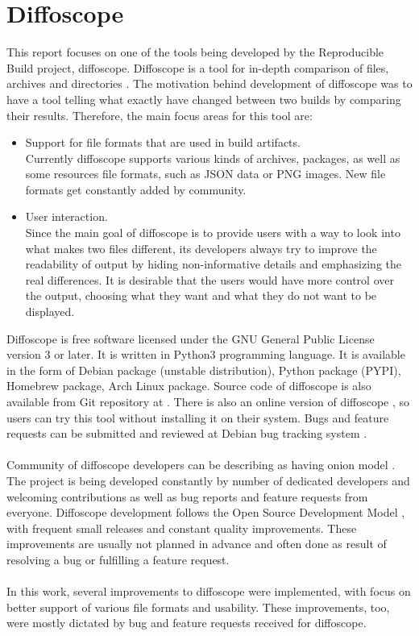 \section{Diffoscope}

This report focuses on one of the tools being developed by the
Reproducible Build project, diffoscope.
Diffoscope is a tool for in-depth comparison of files, archives and
directories \autocite{dfs}.
The motivation behind development of diffoscope was to have a tool
telling what exactly have changed between two builds by comparing
their results. Therefore, the main focus areas for this tool are:
\begin{itemize}
    \item Support for file formats that are used in build artifacts. \\
    Currently diffoscope supports various kinds of archives, packages,
    as well as some resources file formats, such as JSON data or PNG images.
    New file formats get constantly added by community.
    \item User interaction.\\
    Since the main goal of diffoscope is to provide users with a way to look
    into what makes two files different, its developers always try to
    improve the readability of output by hiding non-informative details and
    emphasizing the real differences. It is desirable that the users would
    have more control over the output, choosing what they want and what they
    do not want to be displayed.
\end{itemize}

Diffoscope is free software licensed under the GNU General Public
License version 3 or later. It is written in Python3 programming language.
It is available in the form of Debian package (unstable distribution),
Python package (PYPI), Homebrew package, Arch Linux package. Source code
of diffoscope is also available from Git repository at \autocite{dfs-git}.
There is also an online version of diffoscope \autocite{try-dfs}, so users
can try this tool without installing it on their system.
Bugs and feature requests can be submitted and reviewed at Debian
bug tracking system \autocite{dfs-bugs}.\\\\
Community of diffoscope developers can be describing as having
onion model \autocite{aberdour2007achieving}.
The project is being developed constantly by number of dedicated
developers and welcoming contributions as well as bug reports
and feature requests from everyone.
Diffoscope development follows the Open Source Development Model
\autocite{osdm}, with frequent small releases and constant quality improvements.
These improvements are usually not planned in advance and often
done as result of resolving a bug or fulfilling a feature request.\\\\
In this work, several improvements to diffoscope were implemented,
with focus on better support of various file formats and usability.
These improvements, too, were mostly dictated by bug and feature requests
received for diffoscope.



